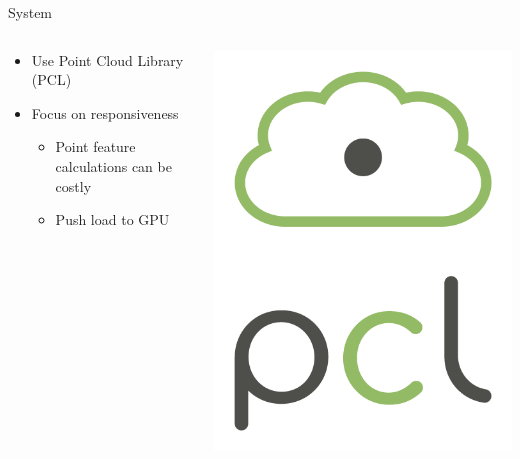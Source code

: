 \documentclass[compress]{beamer}
\begin{document}
\begin{frame}{System}

\begin{columns}[T]
\begin{column}{0.7\textwidth}

\begin{itemize}

\item Use Point Cloud Library (PCL)
\item Focus on responsiveness

\begin{itemize}
\item Point feature calculations can be costly
\item Push load to GPU
\end{itemize}

\end{itemize}

\end{column}
\begin{column}{0.3\textwidth}

\includegraphics[height=0.5\textheight]{pics/pcl_vert_large_pos.png}

\end{column}
\end{columns}

\end{frame}
\end{document}
